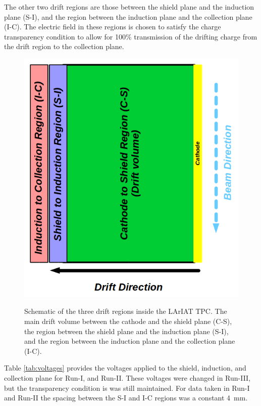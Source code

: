 The other two drift regions are those between the shield plane and the induction plane (S-I), and the region between the induction plane and the collection plane (I-C). The electric field in these regions is chosen to satisfy the charge transparency condition to allow for 100$\%$ transmission of the drifting charge from the drift region to the collection plane.

\begin{figure}[htb]
\centering
\includegraphics[scale=0.35]{./images/DriftRegions.png}\\
\caption{Schematic of the three drift regions inside the LArIAT TPC. The main drift volume between the cathode and the shield plane (C-S), the region between the shield plane and the induction plane (S-I), and the region between the induction plane and the collection plane (I-C).}
\label{fig:driftregions}
\end{figure}

Table \ref{tab:voltages} provides the voltages applied to the shield, induction, and collection plane for Run-I, and Run-II. These voltages were changed in Run-III, but the transparency condition is was still maintained. For data taken in Run-I and Run-II the spacing between the S-I and I-C regions was a constant 4~mm.

